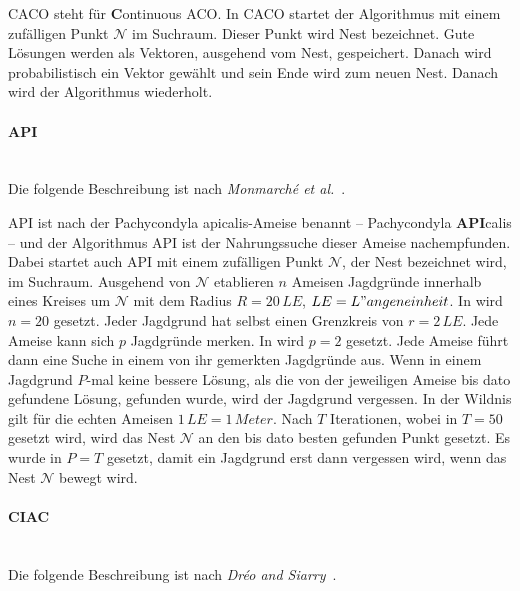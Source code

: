 \documentclass[fontsize=12, a4aper]{scrartcl}
\begin{document}
	CACO steht für \textbf{C}ontinuous ACO. In CACO startet der Algorithmus mit einem zufälligen Punkt \(\mathcal{N}\) im Suchraum. Dieser Punkt wird \glqq Nest\grqq{} bezeichnet. Gute Lösungen werden als Vektoren, ausgehend vom Nest, gespeichert. Danach wird probabilistisch ein Vektor gewählt und sein Ende wird zum neuen Nest. Danach wird der Algorithmus wiederholt.
	
	\paragraph{API}\mbox{}\\
	
	Die folgende Beschreibung ist nach \textit{Monmarché et al.}~\cite{monmarche2000pachycondyla}.\hfill\newline
	
	API ist nach der \glqq Pachycondyla apicalis\grqq-Ameise benannt -- \glqq Pachycondyla \textbf{API}calis\grqq{} -- und der Algorithmus API ist der Nahrungssuche dieser Ameise nachempfunden. Dabei startet auch API mit einem zufälligen Punkt \(\mathcal{N}\), der Nest bezeichnet wird, im Suchraum. Ausgehend von \(\mathcal{N}\) etablieren \(n\) Ameisen Jagdgründe innerhalb eines Kreises um \(\mathcal{N}\) mit dem Radius \(R = 20 \, LE\), \(LE = L"angeneinheit\). In \cite{monmarche2000pachycondyla} wird \(n = 20\) gesetzt. Jeder Jagdgrund hat selbst einen Grenzkreis von \(r = 2 \, LE\). Jede Ameise kann sich \(p\) Jagdgründe merken. In \cite{monmarche2000pachycondyla} wird \(p = 2\) gesetzt. Jede Ameise führt dann eine Suche in einem von ihr gemerkten Jagdgründe aus. Wenn in einem Jagdgrund \(P\)-mal keine bessere Lösung, als die von der jeweiligen Ameise bis dato gefundene Lösung, gefunden wurde, wird der Jagdgrund vergessen. In der Wildnis gilt für die echten Ameisen \(1 \, LE = 1 \, Meter\). Nach \(T\) Iterationen, wobei in \cite{monmarche2000pachycondyla} \(T = 50\) gesetzt wird, wird das Nest \(\mathcal{N}\) an den bis dato besten gefunden Punkt gesetzt. Es wurde in \cite{monmarche2000pachycondyla} \(P = T\) gesetzt, damit ein Jagdgrund erst dann vergessen wird, wenn das Nest \(\mathcal{N}\) bewegt wird.
	
	\paragraph{CIAC}\mbox{}\\
	
	Die folgende Beschreibung ist nach \textit{Dréo and Siarry}~\cite{dreo2002new}.\hfill\newline
	
\end{document}

